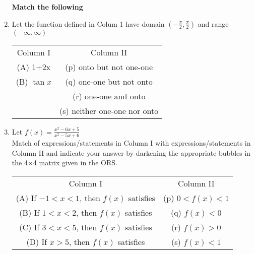 \begin{enumerate}[label=\arabic*.,ref=\thesubsection.\theenumi]
\textbf{Match the following}

\item Let the function defined in Colum 1 have domain $(-\frac{\pi}{2},\frac{\pi}{2})$ and range $(-\infty,\infty)$
\begin{table}[h!]
\centering
\begin{tabular}{c c} 
 Column I & Column II\\ [0.5ex] 
 (A) 1+2x & (p) onto but not one-one\\ 
 (B) $\tan x$ & (q) one-one but not onto\\
     & (r) one-one and onto\\
     & (s) neither one-one nor onto\\[1ex] 
\end{tabular}
\end{table}

\item Let $f(x)=\frac{x^2-6x+5}{x^2-5x+6}$\\
Match of expressions/statements in Column I with expressions/statements in Column II and indicate your answer by darkening the appropriate bubbles in the 4$\times$4 matrix given in the ORS.
\begin{table}[h!]
\centering
\begin{tabular}{c c} 
 Column I & Column II\\ [0.5ex] 
 (A) If $-1 < x < 1$, then $f(x)$ satisfies & (p) $0 < f(x) < 1$\\ 
 (B) If $1 < x < 2$, then $f(x)$ satisfies & (q) $f(x) < 0$\\
 (C) If $3 < x < 5$, then $f(x)$ satisfies   & (r) $f(x) > 0$\\
 (D) If $x > 5$, then $f(x)$ satisfies  & (s) $f(x) < 1$\\[1ex] 
\end{tabular}
\end{table}
 


\end{enumerate}
